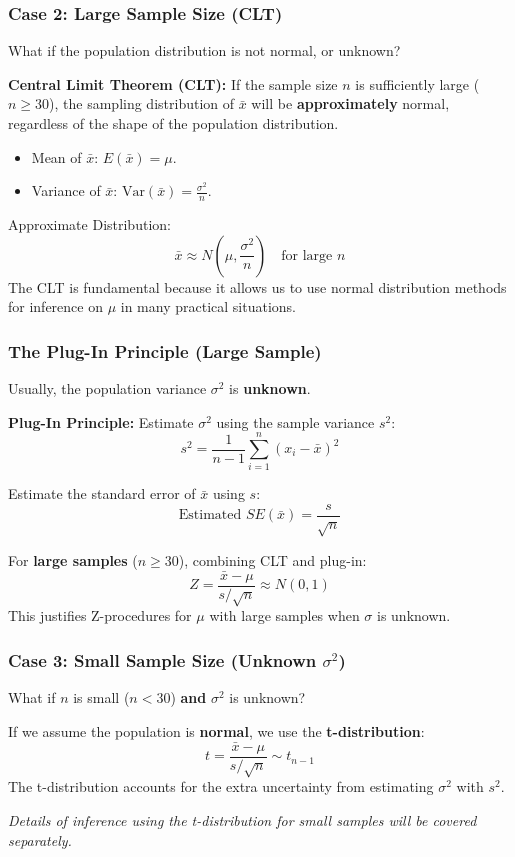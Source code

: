 \documentclass[handout]{beamer} %
\begin{document}
\begin{frame}
\frametitle{Case 2: Large Sample Size (CLT)}
What if the population distribution is not normal, or unknown?

\pause
\textbf{Central Limit Theorem (CLT):} If the sample size \(n\) is sufficiently large (\(n \ge 30\)), the sampling distribution of \(\bar{x}\) will be \textbf{approximately} normal, regardless of the shape of the population distribution.

\pause
\begin{itemize}
    \item Mean of \(\bar{x}\): \(E(\bar{x}) = \mu\).
    \item Variance of \(\bar{x}\): \(\text{Var}(\bar{x}) = \frac{\sigma^2}{n}\).
\end{itemize}

\pause
Approximate Distribution:
\[
\bar{x} \approx N\left(\mu, \frac{\sigma^2}{n}\right) \quad \text{for large } n
\]
The CLT is fundamental because it allows us to use normal distribution methods for inference on \(\mu\) in many practical situations.
\end{frame}

\begin{frame}
\frametitle{The Plug-In Principle (Large Sample)}
Usually, the population variance \(\sigma^2\) is \textbf{unknown}.

\pause
\textbf{Plug-In Principle:} Estimate \(\sigma^2\) using the sample variance \(s^2\):
\[
s^2 = \frac{1}{n-1} \sum_{i=1}^{n} (x_i - \bar{x})^2
\]

\pause
Estimate the standard error of \(\bar{x}\) using \(s\):
\[
\text{Estimated } SE(\bar{x}) = \frac{s}{\sqrt{n}}
\]

\pause
For \textbf{large samples} (\(n \ge 30\)), combining CLT and plug-in:
\[
Z = \frac{\bar{x} - \mu}{s/\sqrt{n}} \approx N(0, 1)
\]
This justifies Z-procedures for \(\mu\) with large samples when \(\sigma\) is unknown.
\end{frame}

\begin{frame}
\frametitle{Case 3: Small Sample Size (Unknown \(\sigma^2\))}
What if \(n\) is small (\(n < 30\)) \textbf{and} \(\sigma^2\) is unknown?

\pause
If we assume the population is \textbf{normal}, we use the \textbf{t-distribution}:
\[
t = \frac{\bar{x} - \mu}{s/\sqrt{n}} \sim t_{n-1}
\]
The t-distribution accounts for the extra uncertainty from estimating \(\sigma^2\) with \(s^2\).

\pause
\textit{Details of inference using the t-distribution for small samples will be covered separately.}
\end{frame}
\end{document}
